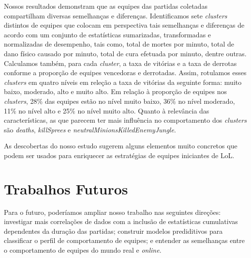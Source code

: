 Nossos resultados demonstram que as equipes das partidas coletadas compartilham diversas semelhanças e diferenças. Identificamos sete \textit{clusters} distintos de equipes que colocam em perspectiva tais semelhanças e diferenças de acordo com um conjunto de estatísticas sumarizadas, transformadas e normalizadas de desempenho, tais como, total de mortes por minuto, total de dano físico causado por minuto, total de cura efetuada por minuto, dentre outras. Calculamos também, para cada \textit{cluster}, a taxa de vitórias e a taxa de derrotas conforme a proporção de equipes vencedoras e derrotadas. Assim, rotulamos esses \textit{clusters} em quatro níveis em releção a taxa de vitórias da seguinte forma: muito baixo, moderado, alto e muito alto. Em relação à proporção de equipes nos \textit{clusters}, 28\% das equipes estão no nível muito baixo, 36\% no nível moderado, 11\% no nível alto e 25\% no nível muito alto. Quanto à relevância das características, as que parecem ter mais influência no comportamento dos \textit{clusters} são \textit{deaths}, \textit{killSprees} e \textit{neutralMinionsKilledEnemyJungle}.

As descobertas do nosso estudo sugerem alguns elementos muito concretos que podem ser usados para enriquecer as estratégias de equipes iniciantes de LoL.

\section{Trabalhos Futuros}
Para o futuro, poderíamos ampliar nosso trabalho nas seguintes direções: investigar mais correlações de dados com a inclusão de estatísticas cumulativas dependentes da duração das partidas; construir modelos prediditivos para classificar o perfil de comportamento de equipes; e entender as semelhanças entre o comportamento de equipes do mundo real e \textit{online}.
